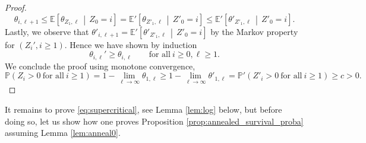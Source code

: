 \documentclass[11 pt]{article}
\theoremstyle{definition}
\numberwithin{equation}{section}
\newcommand{\EE}{\mathbb{E}} %
\newcommand{\PP}{\mathbb{P}} %
\begin{document}
\begin{proof}
\begin{equation*}
	\theta_{i,\ell+1}  \le\EE\left[  \theta_{Z_1, \ell}\,\middle|\,  Z_0 = i   \right] =\EE'\left[  \theta_{Z'_1, \ell}\,\middle|\,  Z'_0 = i   \right] \le   \EE'\left[  \theta'_{Z'_1, \ell}\,\middle|\,  Z'_0 = i   \right].
\end{equation*}
Lastly, we observe that $\theta'_{i,\ell+1}=\EE'\left[  \theta'_{Z'_1, \ell}\,\middle|\,  Z'_0 = i   \right]$ by the Markov property for $(Z_i', i\geq 1)$. 
Hence we have shown by induction 
\begin{equation*}
	\theta_{i,\ell}' \geq \theta_{i,\ell} \qquad \text{for all} ~ i\ge 0,\ell\geq 1.
\end{equation*}
	We conclude the proof using monotone convergence, 
	\begin{equation*}
		\PP\left(Z_i>0 ~\text{for all}~ i\ge 1\right) = 1- \lim_{\ell\to \infty} \theta_{1,\ell} 
		\ge 1- \lim_{\ell\to \infty} \theta'_{1,\ell } = \PP'\left(Z'_i>0 ~\text{for all}~ i\ge 1\right)\geq c >0.
	\end{equation*}
\end{proof}

It remains to prove \eqref{eq:supercritical}, see Lemma \ref{lem:log} below, but before doing so, let us show how one proves Proposition \ref{prop:annealed_survival_proba} assuming Lemma \ref{lem:anneal0}.
\end{document}
